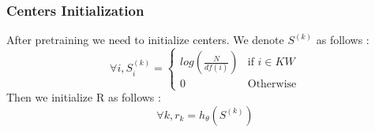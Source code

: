 \subsubsection{Centers Initialization}
After pretraining we need to initialize centers. We denote $S^{(k)}$ as follows :
\begin{equation}
\forall i, S^{(k)}_i = \left\{
    \begin{array}{ll}
        log\left(\frac{N}{df(i)}\right) & \mbox{if } i \in KW \\
        0 & \mbox{Otherwise}
    \end{array}
\right.
\end{equation}
Then we initialize R as follows :
\begin{equation}
\forall k, r_k =  h_\theta(S^{(k)})
\end{equation}

